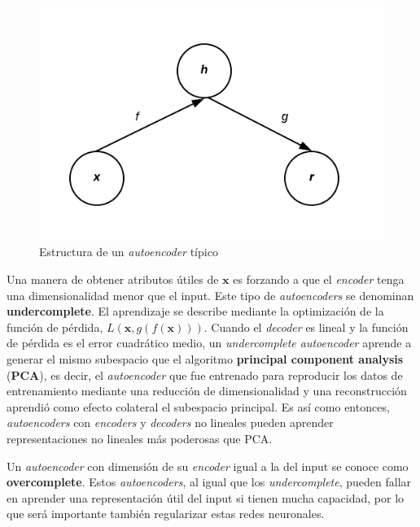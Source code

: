 \begin{figure}[H]
\captionsetup{font=small,labelfont=small}
\caption{Estructura de un \textit{autoencoder} t\'ipico}
\centering
\includegraphics[scale=.8]{img/autoencoder.png}
\end{figure}

Una manera de obtener atributos \'utiles de $\bm{x}$ es forzando a que el \textit{encoder} tenga una dimensionalidad menor que el input. Este tipo de \textit{autoencoders} se denominan \textbf{undercomplete}. El aprendizaje se describe mediante la optimizaci\'on de la funci\'on de p\'erdida, $L(\bm{x}, g(f(\bm{x})))$. Cuando el \textit{decoder} es lineal y la funci\'on de p\'erdida es el error cuadr\'atico medio, un \textit{undercomplete autoencoder} aprende a generar el mismo subespacio que el algoritmo \textbf{principal component analysis} (\textbf{PCA}), es decir, el \textit{autoencoder} que fue entrenado para reproducir los datos de entrenamiento mediante una reducci\'on de dimensionalidad y una reconstrucci\'on aprendi\'o como efecto colateral el subespacio principal. Es as\'i como entonces, \textit{autoencoders} con \textit{encoders} y \textit{decoders} no lineales pueden aprender representaciones no lineales m\'as poderosas que PCA.

Un \textit{autoencoder} con dimensi\'on de su \textit{encoder} igual a la del input se conoce como \textbf{overcomplete}. Estos \textit{autoencoders}, al igual que los \textit{undercomplete}, pueden fallar en aprender una representaci\'on \'util del input si tienen mucha capacidad, por lo que ser\'a importante tambi\'en regularizar estas redes neuronales.

